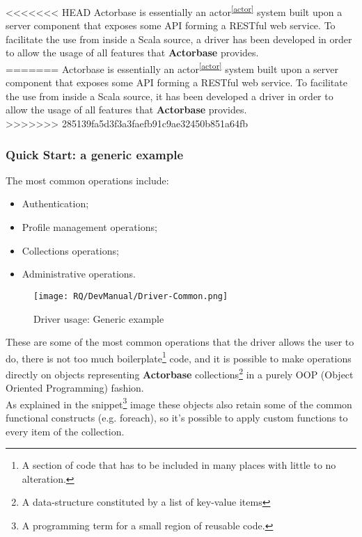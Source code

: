 \documentclass{scalatekids-article}
\begin{document}
<<<<<<< HEAD
Actorbase is essentially an actor\textsuperscript{\ref{actor}} system built upon a server component that
exposes some API forming a RESTful web service. To facilitate the use from
inside a Scala source, a driver has been developed in order to allow the
usage of all features that \textbf{Actorbase} provides.\\
=======
Actorbase is essentially an actor\textsuperscript{\ref{actor}} system built upon
a server component that exposes some API forming a RESTful web service. To
facilitate the use from inside a Scala source, it has been developed a driver in
order to allow the usage of all features that \textbf{Actorbase} provides.\\
>>>>>>> 285139fa5d3f3a3faefb91c9ae32450b851a64fb

\subsubsection{Quick Start: a generic example}

The most common operations include:
\begin{itemize}
\item Authentication;
\item Profile management operations;
\item Collections operations;
\item Administrative operations.
\end{itemize}

\begin{figure}[H]
  \begin{center}
    \texttt{[image: RQ/DevManual/Driver-Common.png]}
    \caption{Driver usage: Generic example}
  \end{center}
\end{figure}

These are some of the most common operations that the driver allows the user to do,
there is not too much boilerplate\footnote{A section of code that has to be
  included in many places with little to no alteration.} code, and it is possible
to make operations directly on objects representing \textbf{Actorbase}
collections\footnote{A data-structure constituted by a list of key-value items\label{coll}}
in a purely OOP (Object Oriented Programming) fashion.\\ As explained in
the snippet\footnote{A programming term for a small region of reusable code.}
image these objects also retain some of the common functional constructs (e.g.
foreach), so it's possible to apply custom functions to every item of the
collection.
\end{document}
